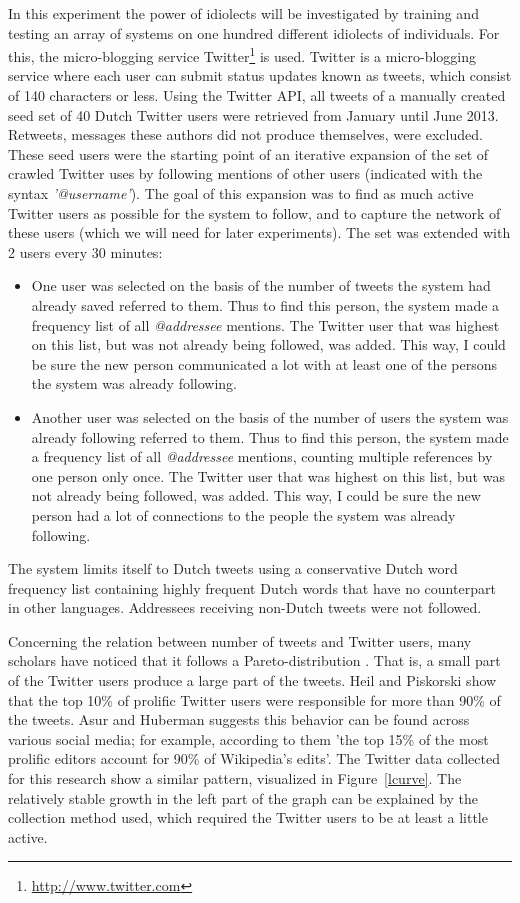 \documentclass[11pt]{article}
\begin{document}
In this experiment the power of idiolects will be investigated by training and testing an array of systems on one hundred different idiolects of individuals. For this, the micro-blogging service Twitter\footnote{\url{http://www.twitter.com}} is used. Twitter is a micro-blogging service where each user can submit status updates known as tweets, which consist of 140 characters or less. Using the Twitter API, all tweets of a manually created seed set of 40 Dutch Twitter users were retrieved from January until June 2013. Retweets, messages these authors did not produce themselves, were excluded. These seed users were the starting point of an iterative expansion of the set of crawled Twitter uses by following mentions of other users (indicated with the syntax \emph{'@username'}). The goal of this expansion was to find as much active Twitter users as possible for the system to follow, and to capture the network of these users (which we will need for later experiments). The set was extended with 2 users every 30 minutes:

\begin{itemize}
\item One user was selected on the basis of the number of tweets the system had already saved referred to them. Thus to find this person, the system made a frequency list of all \emph{@addressee} mentions. The Twitter user that was highest on this list, but was not already being followed, was added. This way, I could be sure the new person communicated a lot with at least one of the persons the system was already following.
\item Another user was selected on the basis of the number of users the system was already following referred to them. Thus to find this person, the system made a frequency list of all \emph{@addressee} mentions, counting multiple references by one person only once. The Twitter user that was highest on this list, but was not already being followed, was added. This way, I could be sure the new person had a lot of connections to the people the system was already following.
\end{itemize}

The system limits itself to Dutch tweets using a conservative Dutch word frequency list containing highly frequent Dutch words that have no counterpart in other languages. Addressees receiving non-Dutch tweets were not followed.

Concerning the relation between number of tweets and Twitter users, many scholars have noticed that it follows a Pareto-distribution \cite{asur+10,rui+12}. That is, a small part of the Twitter users produce a large part of the tweets. Heil and Piskorski  show that the top 10\% of prolific Twitter users were responsible for more than 90\% of the tweets. Asur and Huberman  suggests this behavior can be found across various social media; for example, according to them 'the top 15\% of the most prolific editors account for 90\% of Wikipedia's edits'. The Twitter data collected for this research show a similar pattern, visualized in Figure~\ref{lcurve}. The relatively stable growth in the left part of the graph can be explained by the collection method used, which required the Twitter users to be at least a little active. 
\end{document}
